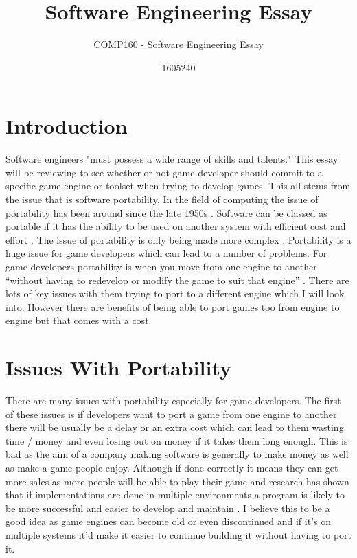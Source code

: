 \documentclass{scrartcl}
\title{Software Engineering Essay}
\subtitle{COMP160 - Software Engineering Essay}
\author{1605240}
\begin{document}
\maketitle


\section{Introduction}

Software engineers "must possess a wide range of skills and talents." \cite{jazayeri2004education} This essay will be reviewing to see whether or not game developer should commit to a specific game engine or toolset when trying to develop games. This all stems from the issue that is software portability. In the field of computing the issue of portability has been around since the late 1950s \cite{garen2007software}. Software can be classed as portable if it has the ability to be used on another system with efficient cost and effort \cite{garen2007software}. The issue of portability is only being made more complex \cite{tanner1996software}. Portability is a huge issue for game developers which can lead to a number of problems. For game developers portability is when you move from one engine to another “without having to redevelop or modify the game to suit that engine” \cite{binsubaih2006architecture}. There are lots of key issues with them trying to port to a different engine which I will look into. However there are benefits of being able to port games too from engine to engine but that comes with a cost. 

\section{Issues With Portability}

There are many issues with portability especially for game developers. The first of these issues is if developers want to port a game from one engine to another there will be usually be a delay or an extra cost \cite{mooney2004developing} which can lead to them wasting time / money and even losing out on money if it takes them long enough. This is bad as the aim of a company making software is generally to make money as well as make a game people enjoy.  Although if done correctly it means they can get more sales as more people will be able to play their game \cite{mooney2004developing} and research has shown that if implementations are done in multiple environments a program is likely to be more successful and easier to develop and maintain \cite{mooney2004developing}. I believe this to be a good idea as game engines can become old or even discontinued \cite{binsubaih2008game} and if it’s on multiple systems it’d make it easier to continue building it without having to port it.
\end{document}
